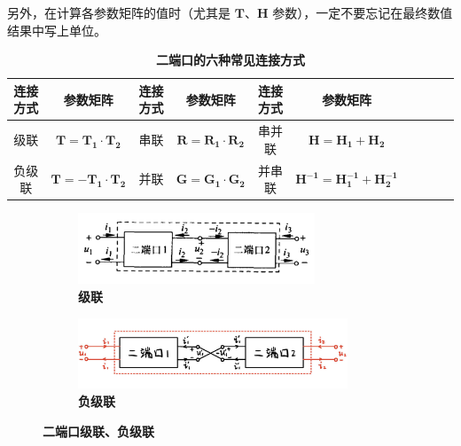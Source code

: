 \documentclass[UTF8]{report}
\theoremstyle{MyLineTheoremStyle} %
\theoremstyle{MyBlockTheoremStyle} %
\theoremstyle{MySubsubsectionStyle} %
\begin{document}
另外，在计算各参数矩阵的值时（尤其是 $\boldsymbol{T}$、$\boldsymbol{H}$ 参数），一定不要忘记在最终数值结果中写上单位。

\begin{table}[H]\centering
    \caption{\textbf{二端口的六种常见连接方式}}
    \label{二端口的六种常见连接方式}
\begin{tabular}{cccccccccc}\toprule
    连接方式 & 参数矩阵 & 连接方式 & 参数矩阵 & 连接方式 & 参数矩阵\\
    \midrule
    级联  &  $\boldsymbol{T} = \boldsymbol{T_1}\cdot \boldsymbol{T_2}$    &   串联 & $\boldsymbol{R} = \boldsymbol{R_1} \cdot \boldsymbol{R_2}$ & 串并联 & $\boldsymbol{H} = \boldsymbol{H_1} + \boldsymbol{H_2}$ \\ 
    负级联 &  $\boldsymbol{T} = -\boldsymbol{T_1}\cdot \boldsymbol{T_2}$  &   并联 & $\boldsymbol{G} = \boldsymbol{G_1}\cdot \boldsymbol{G_2}$ & 并串联 & $\boldsymbol{H^{-1}} = \boldsymbol{H_1^{-1}} + \boldsymbol{H_2^{-1}}$\\ 
    \bottomrule
\end{tabular}
\end{table}

\begin{figure}[H]\centering
\begin{subfigure}[t]{0.42\textwidth}\centering
    \includegraphics[height=60pt]{assets/2/级联.png}
    \caption{\bfseries 级联 }
\end{subfigure}\begin{subfigure}[t]{0.58\textwidth}\centering
    \includegraphics[height=60pt]{assets/2/负级联.png}
    \caption{\bfseries 负级联 }
\end{subfigure}
\caption{\bfseries 二端口级联、负级联}
\end{figure}
\end{document}
